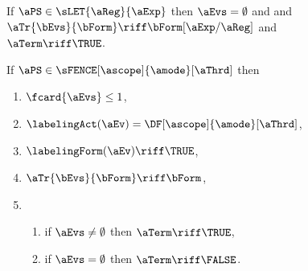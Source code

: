 \begin{figure}

  \noindent
  If $\aPS\in\sLET{\aReg}{\aExp}$ then $\aEvs = \emptyset$ and
  and $\aTr{\bEvs}{\bForm} \riff \bForm[\aExp/\aReg]$
  and $\aTerm\riff\TRUE$.
  \medskip

  \noindent
  If $\aPS \in \sFENCE[\ascope]{\amode}[\aThrd]$ then
  \begin{multicols}{2}
    \begin{enumerate}[topsep=0pt,label=(\textsc{f}\arabic*),ref=\textsc{f}\arabic*]
    \item \label{fence-E}
      $\fcard{\aEvs}\leq1$,
    \item \label{fence-lambda}
      $\labelingAct(\aEv) = \DF[\ascope]{\amode}[\aThrd]$,
    \item \label{fence-kappa}
      $\labelingForm(\aEv) \riff \TRUE$,
    \item \label{fence-tau}
      $\aTr{\bEvs}{\bForm} \riff \bForm$,
    \item[] 
      \begin{enumerate}[leftmargin=0pt]
      \item \label{fence-term-nonempty}
        if $\aEvs\neq\emptyset$ then $\aTerm \riff \TRUE$,
      \item \label{fence-term-empty}
        if $\aEvs=\emptyset$ then $\aTerm \riff \FALSE$.
      \end{enumerate}
    \end{enumerate}
  \end{multicols}
  \medskip


\end{figure}
